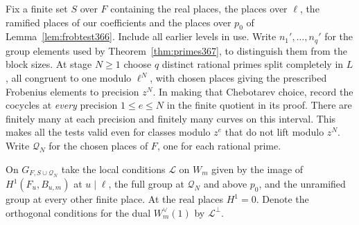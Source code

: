 \documentclass[a4paper,11pt]{article}
\theoremstyle{definition}
\theoremstyle{remark}
\numberwithin{equation}{section}
\begin{document}
Fix a finite set \(S\) over \(F\) containing the real places,
the places over \(\ell\), the ramified places of our coefficients
and the places over \(p_0\) of Lemma~\ref{lem:frobtest366}.
Include all earlier levels in use. Write \(n_1',\ldots,n_q'\)
for the group elements used by Theorem~\ref{thm:primes367},
to distinguish them from the block sizes. At stage \(N\ge1\)
choose \(q\) distinct rational primes split completely in \(L\),
all congruent to one modulo \(\ell^N\), with chosen places
giving the prescribed Frobenius elements to precision \(z^N\).
In making that Chebotarev choice, record the cocycles at
\emph{every} precision \(1\le e\le N\) in the finite quotient
in its proof. There are finitely many at each precision and
finitely many curves on this interval. This makes all the tests
valid even for classes modulo \(z^e\) that do not lift modulo
\(z^N\). Write \(\mathcal Q_N\) for the chosen places of \(F\),
one for each rational prime.

On \(G_{F,S\cup\mathcal Q_N}\) take the local conditions
\(\mathcal L\) on \(W_m\) given by the image of \(H^1(F_u,B_{u,m})\)
at \(u\mid\ell\), the full group at \(\mathcal Q_N\) and above
\(p_0\), and the unramified group at every other finite place.
At the real places \(H^1=0\). Denote the orthogonal conditions
for the dual \(W_m^\vee(1)\) by \(\mathcal L^\perp\).
\end{document}
